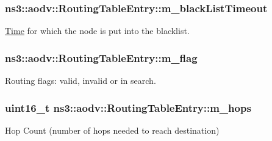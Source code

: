 \subsubsection[{\texorpdfstring{m\+\_\+black\+List\+Timeout}{m_blackListTimeout}}]{ ns3\+::aodv\+::\+Routing\+Table\+Entry\+::m\+\_\+black\+List\+Timeout\hspace{0.3cm}{\ttfamily [private]}}\hypertarget{classns3_1_1aodv_1_1RoutingTableEntry_ae67edae13b53dd87f8f36adebb867703}{}\label{classns3_1_1aodv_1_1RoutingTableEntry_ae67edae13b53dd87f8f36adebb867703}


\hyperlink{classns3_1_1Time}{Time} for which the node is put into the blacklist. 

\subsubsection[{\texorpdfstring{m\+\_\+flag}{m_flag}}]{ ns3\+::aodv\+::\+Routing\+Table\+Entry\+::m\+\_\+flag\hspace{0.3cm}{\ttfamily [private]}}\hypertarget{classns3_1_1aodv_1_1RoutingTableEntry_ae8b0a48e515e40658c7f2f2e8e808e05}{}\label{classns3_1_1aodv_1_1RoutingTableEntry_ae8b0a48e515e40658c7f2f2e8e808e05}


Routing flags\+: valid, invalid or in search. 

\subsubsection[{\texorpdfstring{m\+\_\+hops}{m_hops}}]{\setlength{\rightskip}{0pt plus 5cm}uint16\+\_\+t ns3\+::aodv\+::\+Routing\+Table\+Entry\+::m\+\_\+hops\hspace{0.3cm}{\ttfamily [private]}}\hypertarget{classns3_1_1aodv_1_1RoutingTableEntry_a6dae8561857f2b7215708a317b50b089}{}\label{classns3_1_1aodv_1_1RoutingTableEntry_a6dae8561857f2b7215708a317b50b089}


Hop Count (number of hops needed to reach destination) 

